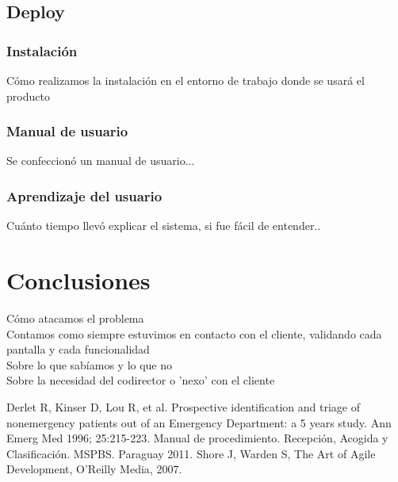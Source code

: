 \documentclass[a4paper,10pt]{article}
\begin{document}
\subsection{Deploy}
\subsubsection{Instalación}
Cómo realizamos la instalación en el entorno de trabajo donde se usará el producto
\subsubsection{Manual de usuario}
Se confeccionó un manual de usuario...
\subsubsection{Aprendizaje del usuario}
Cuánto tiempo llevó explicar el sistema, si fue fácil de entender..

\newpage 
\section{Conclusiones}
Cómo atacamos el problema\\
Contamos como siempre estuvimos en contacto con el cliente, validando cada pantalla y cada funcionalidad\\
Sobre lo que sabíamos y lo que no\\
Sobre la necesidad del codirector o 'nexo' con el cliente



\newpage 

\begin{thebibliography}{3} 
\bibitem{} Derlet R, Kinser D, Lou R, et al. Prospective identification and triage of nonemergency patients out of an Emergency Department: a 5 years study. Ann Emerg Med 1996; 25:215-223.
\bibitem{} Manual de procedimiento. Recepción,  Acogida y Clasificación.  MSPBS. Paraguay 2011.
\bibitem{} Shore J, Warden S, The Art of Agile Development, O’Reilly Media, 2007.

\end{thebibliography}
 
\end{document}
